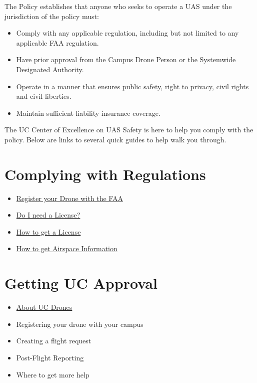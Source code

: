 \documentclass[
]{book}
\providecommand{\tightlist}{%
  \setlength{\itemsep}{0pt}\setlength{\parskip}{0pt}}
\begin{document}
The Policy establishes that anyone who seeks to operate a UAS under the jurisdiction of the policy must:

\begin{itemize}
\tightlist
\item
  Comply with any applicable regulation, including but not limited to any applicable FAA regulation.
\item
  Have prior approval from the Campus Drone Person or the Systemwide Designated Authority.
\item
  Operate in a manner that ensures public safety, right to privacy, civil rights and civil liberties.
\item
  Maintain sufficient liability insurance coverage.
\end{itemize}

The UC Center of Excellence on UAS Safety is here to help you comply with the policy. Below are links to several quick guides to help walk you through.

\hypertarget{complying-with-regulations}{%
\section*{Complying with Regulations}\label{complying-with-regulations}}

\begin{itemize}
\tightlist
\item
  \protect\hyperlink{ch-register}{Register your Drone with the FAA}
\item
  \protect\hyperlink{ch-license}{Do I need a License?}
\item
  \protect\hyperlink{ch-get-license}{How to get a License}
\item
  \protect\hyperlink{ch-airspace-info}{How to get Airspace Information}
\end{itemize}

\hypertarget{getting-uc-approval}{%
\section*{Getting UC Approval}\label{getting-uc-approval}}

\begin{itemize}
\tightlist
\item
  \protect\hyperlink{ch-about-UCdrones}{About UC Drones}
\item
  Registering your drone with your campus
\item
  Creating a flight request
\item
  Post-Flight Reporting
\item
  Where to get more help
\end{itemize}
\end{document}
